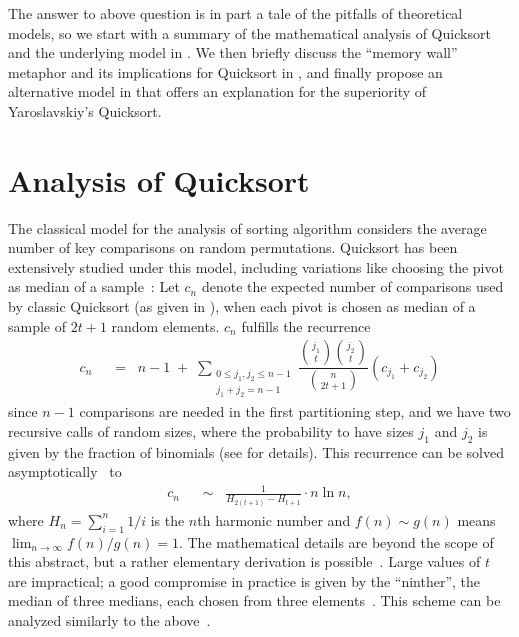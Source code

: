 \documentclass[]{theotage}
\newcommand\wwrel[1]{\mathrel{\;\;{#1}\;\;}}
\newcommand\wbin[1]{\mathbin{\;{#1}\;}}
\begin{document}
The answer to above question is in part a tale of the pitfalls of theoretical models,
so we start with a summary of the mathematical analysis of Quicksort and
the underlying model in .
We then briefly discuss the ``memory wall'' metaphor and its implications for Quicksort in ,
and finally propose an alternative model in  
that offers an explanation for the superiority of Yaroslavskiy's Quicksort.


\section{Analysis of Quicksort}
\label{sec:classic-analysis}

The classical model for the analysis of sorting algorithm considers the 
average number of key comparisons on random permutations.
Quicksort has been extensively studied under this model,
including variations like choosing the pivot as median of a sample~\cite{Hoare1962,VanEmden1970VanFun,Sedgewick1975,Martinez2001,Durand2003pseudonine}:
Let $c_n$ denote the expected number of comparisons used by classic Quicksort 
(as given in \cite{Sedgewick1978}), when each
pivot is chosen as median of a sample of $2t+1$ random elements. $c_n$ fulfills
the recurrence
\begin{align}
\label{eq:recurrence-cmps}
		c_n
	&\wwrel=
		n - 1 \wbin+ 
		\sum_{\substack{0\le j_1,j_2 \le n-1\\j_1+j_2=n-1}}
		\dfrac{ \binom{j_1}{t}\binom{j_2}{t} }{ \binom n{2t+1} }
		(c_{j_1} + c_{j_2})
\end{align}
since $n - 1$ comparisons are needed in the first partitioning step, 
and we have two recursive calls of random sizes, 
where the probability to have sizes $j_1$ and $j_2$ is given by the fraction of
binomials (see \cite{MartinezNebelWild2015aofaFullPaper} for details).
This recurrence can be solved asymptotically~\cite{VanEmden1970VanFun,Sedgewick1975} to
\begin{align*}
		c_n 
	&\wwrel\sim
		\frac{1}{H_{2(t+1)} - H_{t+1}} \cdot n\ln n,
\end{align*}
where $H_n=\sum_{i=1}^n 1/i$ is the $n$th harmonic number 
and $f(n)\sim g(n)$ means $\lim_{n\to\infty} f(n)/g(n) = 1$.
The mathematical details are beyond the scope of this abstract, 
but a rather elementary derivation is possible~\cite{Martinez2001}.
Large values of $t$ are impractical; a good compromise in practice is given by the ``ninther'', 
the median of three medians, each chosen from three elements~\cite{Bentley1993}.
This scheme can be analyzed similarly to the above~\cite{Durand2003pseudonine}.
\end{document}
